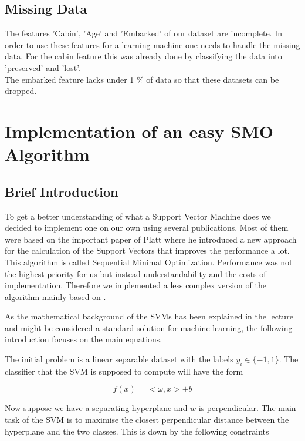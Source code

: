 \subsection{Missing Data}
\label{sec:missingdata}
The features 'Cabin', 'Age' and 'Embarked' of our dataset are incomplete. In order to use these features for a learning machine one needs to handle the missing data. For the cabin feature this was already done by classifying the data into 'preserved' and 'lost'.\\
The embarked feature lacks under 1 \% of data so that these datasets can be dropped.\\



\section{Implementation of an easy SMO Algorithm}
\subsection{Brief Introduction}
To get a better understanding of what a Support Vector Machine does we decided to implement one on our own using several publications. Most of them were based on the important paper of Platt \cite{platt} where he introduced a new approach for the calculation of the Support Vectors that improves the performance a lot. This algorithm is called Sequential Minimal Optimization. Performance was not the highest priority for us but instead understandability and the costs of implementation. Therefore we implemented a less complex version of the algorithm mainly based on \cite{smo}.

As the mathematical background of the SVMs has been explained in the lecture and might be considered a standard solution for machine learning, the following introduction focuses on the main equations.

The initial problem is a linear separable dataset with the labels $y_i \in \{-1, 1\}$. The classifier that the SVM is supposed to compute will have the form

\begin{equation}
    f(x) = <\omega, x> + b
\end{equation}

Now suppose we have a separating hyperplane and $w$ is perpendicular. The main task of the SVM is to maximise the closest perpendicular distance between the hyperplane and the two classes. This is down by the following constraints

